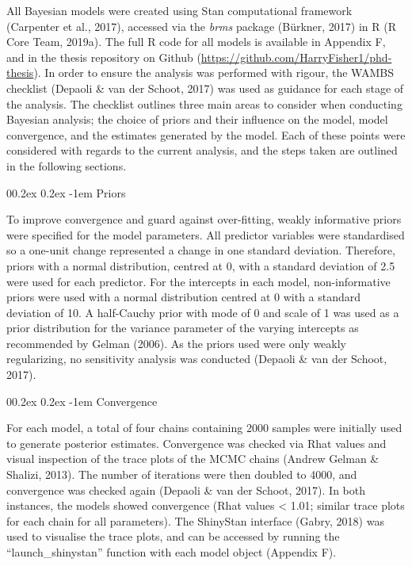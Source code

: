 \documentclass[
  english,
  man,floatsintext]{apa6}
\makeatletter
\renewcommand{\paragraph}{\@startsection{paragraph}{4}{\parindent}%
  {0\baselineskip \@plus 0.2ex \@minus 0.2ex}%
  {-1em}%
  {\normalfont\normalsize\bfseries\itshape\typesectitle}}
\makeatother
\begin{document}
All Bayesian models were created using Stan computational framework (Carpenter et al., 2017), accessed via the \emph{brms} package (Bürkner, 2017) in R (R Core Team, 2019a).
The full R code for all models is available in Appendix F, and in the thesis repository on Github (\url{https://github.com/HarryFisher1/phd-thesis}).
In order to ensure the analysis was performed with rigour, the WAMBS checklist (Depaoli \& van der Schoot, 2017) was used as guidance for each stage of the analysis.
The checklist outlines three main areas to consider when conducting Bayesian analysis; the choice of priors and their influence on the model, model convergence, and the estimates generated by the model.
Each of these points were considered with regards to the current analysis, and the steps taken are outlined in the following sections.

\hypertarget{priors}{%
\paragraph{Priors}\label{priors}}

To improve convergence and guard against over-fitting, weakly informative priors were specified for the model parameters.
All predictor variables were standardised so a one-unit change represented a change in one standard deviation.
Therefore, priors with a normal distribution, centred at 0, with a standard deviation of 2.5 were used for each predictor.
For the intercepts in each model, non-informative priors were used with a normal distribution centred at 0 with a standard deviation of 10.
A half-Cauchy prior with mode of 0 and scale of 1 was used as a prior distribution for the variance parameter of the varying intercepts as recommended by Gelman (2006).
As the priors used were only weakly regularizing, no sensitivity analysis was conducted (Depaoli \& van der Schoot, 2017).

\hypertarget{convergence}{%
\paragraph{Convergence}\label{convergence}}

For each model, a total of four chains containing 2000 samples were initially used to generate posterior estimates.
Convergence was checked via Rhat values and visual inspection of the trace plots of the MCMC chains (Andrew Gelman \& Shalizi, 2013).
The number of iterations were then doubled to 4000, and convergence was checked again (Depaoli \& van der Schoot, 2017).
In both instances, the models showed convergence (Rhat values \textless{} 1.01; similar trace plots for each chain for all parameters).
The ShinyStan interface (Gabry, 2018) was used to visualise the trace plots, and can be accessed by running the \enquote{launch\_shinystan} function with each model object (Appendix F).
\end{document}
